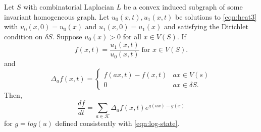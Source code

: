 \begin{lem}\label{prop:ratio_rel}
 Let $S$ with combinatorial Laplacian $L$ be a convex induced subgraph of some invariant homogeneous graph. Let $u_0(x,t),u_1(x,t)$ be solutions to \cref{eqn:heat3} with $u_0(x,0)=u_0(x)$ and $u_1(x,0)=u_1(x)$ and satisfying the Dirichlet condition on $\delta S$. Suppose $u_0(x) > 0$ for all $x \in V(S)$. If
	\begin{equation*}
		f(x,t) = \frac{u_1(x,t)}{u_0(x,t)} \; \text{for $x \in V(S)$}. 
	\end{equation*} 
 and 
	\begin{equation*}
		\Delta_a f(x,t) = \begin{cases}
			f(ax,t)-f(x,t) & ax \in V(s) \\
			0 & ax \in \delta S.
		\end{cases}
	\end{equation*} 
Then,
 \begin{equation*}
  \frac{d f}{dt} = \sum_{a \in \mathcal{K}} \Delta_a f(x,t) e^{g(ax)-g(x)}
 \end{equation*}
 for $g = log(u)$ defined consistently with \cref{eqn:log-state}.
\end{lem}

